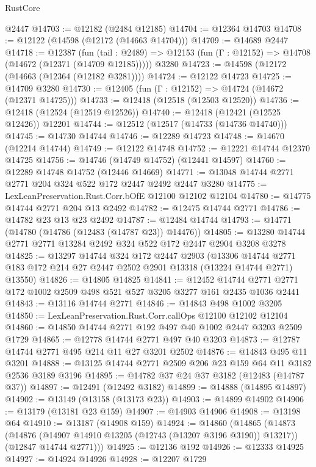 \begin{lexlean}{RustCore}
\begin{coremodule}
    @2447
@14703 := @12182 (@2484 @12185)
@14704 := @12364 @14703
@14708 := @12122 (@14598 (@12172 (@14663 @14704)))
@14709 := @14689 @2447
@14718 := @12387
    (fun (tail : @2489) => @12153 (fun (Γ : @12152) => @14708 (@14672 (@12371 (@14709 @12185)))))
    @3280
@14723 := @14598 (@12172 (@14663 (@12364 (@12182 @3281))))
@14724 := @12122 @14723
@14725 := @14709 @3280
@14730 := @12405 (fun (Γ : @12152) => @14724 (@14672 (@12371 @14725)))
@14733 := @12418 (@12518 (@12503 @12520))
@14736 := @12418 (@12524 (@12519 @12526))
@14740 := @12418 (@12421 (@12525 @12426)) @12201
@14744 := @12512 (@12517 (@14733 (@14736 @14740)))
@14745 := @14730 @14744
@14746 := @12289 @14723
@14748 := @14670 (@12214 @14744)
@14749 := @12122 @14748
@14752 := @12221 @14744 @12370 @14725
@14756 := @14746 (@14749 @14752) (@12441 @14597)
@14760 := @12289 @14748 @14752 (@12446 @14669)
@14771 := @13048 @14744 @2771 @2771 @204 @324 @522 @172 @2447 @2492 @2447 @3280
@14775 := LexLeanPreservation.Rust.Corr.bOfE @12100 @12102 @12104
@14780 := @14775 @14744 @2771 @204 @13 @2492
@14782 := @12475 @14744 @2771
@14786 := @14782 @23 @13 @23 @2492
@14787 := @12484 @14744
@14793 := @14771 (@14780 (@14786 (@12483 (@14787 @23)) @14476))
@14805 := @13280 @14744 @2771 @2771 @13284 @2492 @324 @522 @172 @2447 @2904 @3208 @3278
@14825 := @13297
    @14744
    @324
    @172
    @2447
    @2903
    (@13306 @14744 @2771 @183 @172 @214 @27 @2447 @2502 @2901 @13318 (@13224 @14744 @2771) @13550)
@14826 := @14805 @14825
@14841 := @12452
    @14744
    @2771
    @2771
    @172
    @1002
    @2509
    @498
    @521
    @527
    @3205
    @3277
    @161
    @2435
    @1036
    @2441
@14843 := @13116 @14744 @2771
@14846 := @14843 @498 @1002 @3205
@14850 := LexLeanPreservation.Rust.Corr.callOps @12100 @12102 @12104
@14860 := @14850 @14744 @2771 @192 @497 @40 @1002 @2447 @3203 @2509 @1729
@14865 := @12778 @14744 @2771 @497 @40 @3203
@14873 := @12787 @14744 @2771 @495 @214 @11 @27 @3201 @2502
@14876 := @14843 @495 @11 @3201
@14888 := @13125 @14744 @2771 @2509 @206 @23 @159 @64 @11 @3182 @2536 @3189 @3196
@14895 := @14782 @37 @24 @37 @3182 (@12483 (@14787 @37))
@14897 := @12491 (@12492 @3182)
@14899 := @14888 (@14895 @14897)
@14902 := @13149 (@13158 (@13173 @23))
@14903 := @14899 @14902
@14906 := @13179 (@13181 @23 @159)
@14907 := @14903 @14906
@14908 := @13198 @64
@14910 := @13187 (@14908 @159)
@14924 := @14860
    (@14865
      (@14873
        (@14876 (@14907 @14910 @13205 (@12743 (@13207 @3196 @3190)) @13217))
        (@12847 @14744 @2771)))
@14925 := @12136 @192
@14926 := @12333 @14925
@14927 := @14924 @14926
@14928 := @12207 @1729

\end{coremodule}
\end{lexlean}
